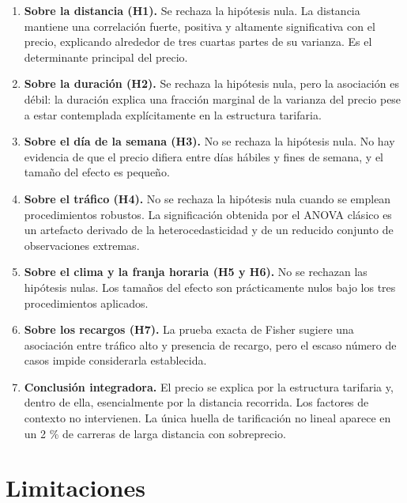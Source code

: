 \documentclass[
]{book}
\begin{document}
\begin{enumerate}
\def\labelenumi{\arabic{enumi}.}
\item
  \textbf{Sobre la distancia (H1).} Se rechaza la hipótesis nula. La distancia mantiene una
  correlación fuerte, positiva y altamente significativa con el precio, explicando alrededor
  de tres cuartas partes de su varianza. Es el determinante principal del precio.
\item
  \textbf{Sobre la duración (H2).} Se rechaza la hipótesis nula, pero la asociación es débil: la
  duración explica una fracción marginal de la varianza del precio pese a estar contemplada
  explícitamente en la estructura tarifaria.
\item
  \textbf{Sobre el día de la semana (H3).} No se rechaza la hipótesis nula. No hay evidencia de
  que el precio difiera entre días hábiles y fines de semana, y el tamaño del efecto es
  pequeño.
\item
  \textbf{Sobre el tráfico (H4).} No se rechaza la hipótesis nula cuando se emplean procedimientos
  robustos. La significación obtenida por el ANOVA clásico es un artefacto derivado de la
  heterocedasticidad y de un reducido conjunto de observaciones extremas.
\item
  \textbf{Sobre el clima y la franja horaria (H5 y H6).} No se rechazan las hipótesis nulas. Los
  tamaños del efecto son prácticamente nulos bajo los tres procedimientos aplicados.
\item
  \textbf{Sobre los recargos (H7).} La prueba exacta de Fisher sugiere una asociación entre
  tráfico alto y presencia de recargo, pero el escaso número de casos impide considerarla
  establecida.
\item
  \textbf{Conclusión integradora.} El precio se explica por la estructura tarifaria y, dentro de
  ella, esencialmente por la distancia recorrida. Los factores de contexto no intervienen. La
  única huella de tarificación no lineal aparece en un 2 \% de carreras de larga distancia con
  sobreprecio.
\end{enumerate}

\section{Limitaciones}\label{limitaciones}
\end{document}
